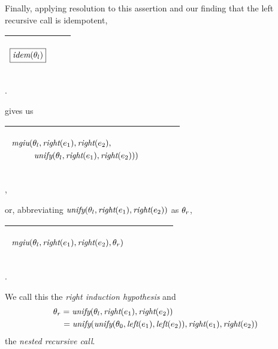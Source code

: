 \documentclass[runningheads]{llncs}
\DeclareMathOperator{\unify}{\emph{unify}}
\DeclareMathOperator{\lef}{\emph{left}}
\DeclareMathOperator{\rig}{\emph{right}}
\DeclareMathOperator{\idem}{\emph{idem}}
\DeclareMathOperator{\mgiu}{\emph{mgiu}}
\begin{document}
Finally, applying resolution to this assertion and our finding that the left recursive call is idempotent,
\begin{center}
  \begin{tabular}{|m{}|m{}||m{}|}
\hline
\begin{center}
{$
\begin{aligned}
\boxed{\idem(\thet{l})}
\end{aligned} $}  \hspace{0cm} 
\end{center}& &  \\  \hline
\end{tabular}.
\end{center}
gives us
  \begin{center}
  \begin{tabular}{|m{}|m{}||m{}|}
\hline
\begin{center}
{$\begin{aligned}
 &\begin{aligned}
 &\begin{aligned}
    {\,\mgiu}(&\thet{l}, \rig(\e{1}), \rig(\e{2}), \\
    &\unify(\thet{l}, \rig(\e{1}), \rig(\e{2}))) 
\end{aligned}
\end{aligned} \end{aligned}  $}  \hspace{1cm} 
\end{center}& &  \\  \hline
\end{tabular},
\end{center}
or, abbreviating $\unify(\thet{l}, \rig(\e{1}), \rig(\e{2}))$ as $\theta_{r}$,
  \begin{center}
  \begin{tabular}{|m{}|m{}||m{}|}
\hline
\begin{center}
{$\begin{aligned}
 &\begin{aligned}
 &\begin{aligned}
    {\,\mgiu}(&\thet{l}, \rig(\e{1}), \rig(\e{2}), \thet{r}) 
\end{aligned}
\end{aligned} \end{aligned}  $}  \hspace{1cm} 
\end{center}& &  \\  \hline
\end{tabular}.
\end{center}
We call this the \emph{right induction hypothesis} and 
\[\thet{r}
\begin{aligned}[t]
&= \unify(\thet{l}, \rig(\e{1}), \rig(\e{2})) \\
 &\begin{aligned}[t]
 \,\, = \unify(\unify(\thet{0}, \lef(\e{1}), \lef(\e{2})), \rig(\e{1}), \rig(\e{2}))
\end{aligned}
\end{aligned}
\]
the \emph{nested recursive call}.
\end{document}
